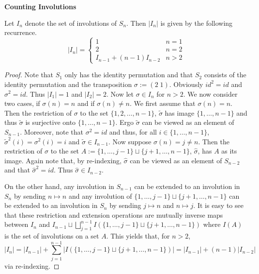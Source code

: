 
\noindent\textbf{Counting Involutions}

\begin{theorem}
    Let $I_n$ denote the set of involutions of $S_n$. Then $|I_n|$ is given by the following recurrence.
    \[
        |I_n|=\begin{cases}
            1 & n=1\\
            2 & n=2\\
            I_{n-1}+(n-1)I_{n-2} & n>2
        \end{cases}
    \]
\end{theorem}
\begin{proof}
    Note that $S_1$ only has the identity permutation and that $S_2$ consists of the identity permutation and the
    transposition $\sigma:=(2\; 1)$. Obviously $id^2=id$ and $\sigma^2=id$. Thus $|I_1|=1$ and $|I_2|=2$. Now let
    $\sigma\in I_n$ for $n>2$. We now consider two cases, if $\sigma(n)=n$ and if $\sigma(n)\neq n$. We first assume
    that $\sigma(n)=n$. Then the restriction of $\sigma$ to the set $\{1,2,\ldots,n-1\}$, $\widetilde{\sigma}$ has image
    $\{1,\ldots,n-1\}$ and thus $\widetilde{\sigma}$ is surjective onto $\{1,\ldots,n-1\}$. Ergo $\widetilde{\sigma}$
    can be viewed as an element of $S_{n-1}$. Moreover, note that $\sigma^2=id$ and thus, for all $i\in\{1,\ldots,n-1\}$,
    $\widetilde{\sigma}^2(i)=\sigma^2(i)=i$ and $\widetilde{\sigma}\in I_{n-1}$. Now suppose $\sigma(n)=j\neq n$. Then
    the restriction of $\sigma$ to the set $A:=\{1,\ldots,j-1\}\sqcup\{j+1,\ldots,n-1\}$, $\widehat{\sigma}$, has $A$ as
    its image. Again note that, by re-indexing, $\widehat{\sigma}$ can be viewed as an element of $S_{n-2}$ and that
    $\widehat{\sigma}^2=id$. Thus $\widehat{\sigma}\in I_{n-2}$.

    On the other hand, any involution in $S_{n-1}$ can be extended to an involution in $S_n$ by sending $n\mapsto n$
    and any involution of $\{1,\ldots,j-1\}\sqcup\{j+1,\ldots,n-1\}$ can be extended to an involution in $S_n$ by
    sending $j\mapsto n$ and $n\mapsto j$. It is easy to see that these restriction and extension operations are mutually
    inverse maps between $I_n$ and $I_{n-1}\sqcup\bigsqcup_{j=1}^{n-1} I(\{1,\ldots,j-1\}\sqcup\{j+1,\ldots,n-1\})$ where
    $I(A)$ is the set of involutions on a set $A$. This yields that, for $n>2$,
    \[
        |I_n|=|I_{n-1}|+\sum_{j=1}^{n-1}|I(\{1,\ldots,j-1\}\sqcup\{j+1,\ldots,n-1\})|=|I_{n-1}|+(n-1)|I_{n-2}|
    \] 
    via re-indexing.
\end{proof}

